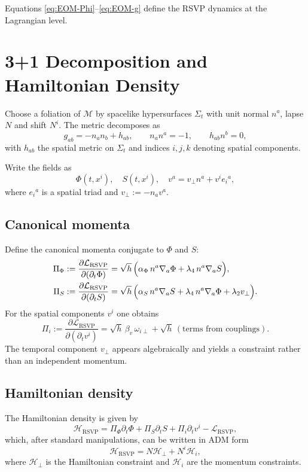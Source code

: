Equations \eqref{eq:EOM-Phi}–\eqref{eq:EOM-g} define the RSVP dynamics at the Lagrangian level.

\section{3+1 Decomposition and Hamiltonian Density}

Choose a foliation of $\mathcal{M}$ by spacelike hypersurfaces $\Sigma_t$ with unit normal $n^a$, lapse $N$ and shift $N^i$. The metric decomposes as
\[
g_{ab} = -n_a n_b + h_{ab},\qquad
n_a n^a = -1,\qquad
h_{ab} n^b = 0,
\]
with $h_{ab}$ the spatial metric on $\Sigma_t$ and indices $i,j,k$ denoting spatial components.

Write the fields as
\[
\Phi(t,x^i),\quad S(t,x^i),\quad v^a = v_\perp n^a + v^i e_i{}^a,
\]
where $e_i{}^a$ is a spatial triad and $v_\perp := -n_a v^a$.

\subsection{Canonical momenta}

Define the canonical momenta conjugate to $\Phi$ and $S$:
\begin{align}
\Pi_\Phi
  &:= \frac{\partial\mathcal{L}_{\mathrm{RSVP}}}{\partial(\partial_t \Phi)}
   = \sqrt{h}\,\Bigl(
        \alpha_\Phi\,n^a \nabla_a\Phi
      + \lambda_4\,n^a \nabla_a S
     \Bigr), \\
\Pi_S
  &:= \frac{\partial\mathcal{L}_{\mathrm{RSVP}}}{\partial(\partial_t S)}
   = \sqrt{h}\,\Bigl(
        \alpha_S\,n^a \nabla_a S
      + \lambda_4\,n^a \nabla_a \Phi
      + \lambda_2 v_\perp
     \Bigr).
\end{align}
For the spatial components $v^i$ one obtains
\begin{equation}
\Pi_i
  := \frac{\partial\mathcal{L}_{\mathrm{RSVP}}}{\partial(\partial_t v^i)}
   = \sqrt{h}\,\beta_v\,\omega_{i\perp}
   + \sqrt{h}\,(\text{terms from couplings}).
\end{equation}
The temporal component $v_\perp$ appears algebraically and yields a constraint rather than an independent momentum.

\subsection{Hamiltonian density}

The Hamiltonian density is given by
\[
\mathcal{H}_{\mathrm{RSVP}}
  = \Pi_\Phi \partial_t \Phi
    + \Pi_S \partial_t S
    + \Pi_i \partial_t v^i
    - \mathcal{L}_{\mathrm{RSVP}},
\]
which, after standard manipulations, can be written in ADM form
\begin{equation}
\mathcal{H}_{\mathrm{RSVP}}
  = N \mathcal{H}_\perp + N^i \mathcal{H}_i,
\end{equation}
where $\mathcal{H}_\perp$ is the Hamiltonian constraint and $\mathcal{H}_i$ are the momentum constraints.

